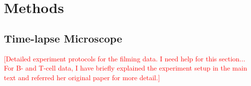 \documentclass[11pt, a4paper]{article}
\begin{document}

\nolinenumbers
\section{Methods}

\nolinenumbers
\subsection{Time-lapse Microscope}
\textcolor{red}{[Detailed experiment protocols for the filming data. I need help for this section... For B- and T-cell data, I have briefly explained the experiment setup in the main text and referred her original paper for more detail.]}

\nolinenumbers
\end{document}
